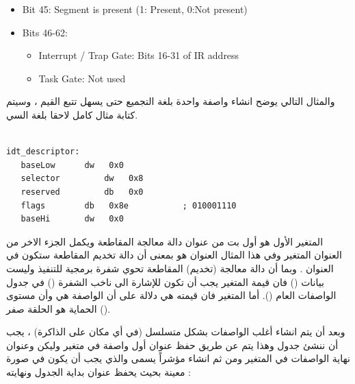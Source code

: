 \documentclass[document.tex]{subfiles}
\begin{document}
\begin{english}
\begin{itemize}
\item Bit 45: Segment is present (1: Present, 0:Not present)
\item Bits 46-62: 
\begin{itemize}
\item Interrupt / Trap Gate: Bits 16-31 of IR address
\item Task Gate: Not used
\end{itemize}

\end{itemize}
\end{english}

والمثال التالي يوضح انشاء واصفة واحدة بلغة التجميع حتى يسهل تتبع القيم ، وسيتم كتابة مثال كامل لاحقا بلغة السي.

\begin{english}

\lstset{numberstyle=\tiny,numbers=left,stepnumber=1,numbersep=5pt,tabsize=2,extendedchars=true,breaklines=true,frame=b,showspaces=false, showtabs=false,xleftmargin=10pt,framexleftmargin=10pt,framexrightmargin=5pt,framexbottommargin=4pt,showstringspaces=false,language=[x86masm]Assembler}


\begin{lstlisting}[label=idt_desc,caption=\en{Example of interrupt descriptor}]

idt_descriptor:
   baseLow     	dw   0x0 
   selector      	dw   0x8
   reserved     	db   0x0 
   flags      	db   0x8e           ; 010001110
   baseHi      	dw   0x0

\end{lstlisting}
\end{english}

المتغير الأول  هو أول  بت من عنوان دالة معالجة المقاطعة  ويكمل الجزء الاخر من العنوان المتغير  وفي هذا المثال العنوان هو  بمعنى أن دالة تخديم المقاطعة ستكون في العنوان .  وبما أن دالة معالجة (تخديم) المقاطعة تحوي شفرة برمجية للتنفيذ وليست بيانات () فان قيمة المتغير  يجب أن تكون  للإشارة الى ناخب الشفرة () في جدول الواصفات العام ().  أما المتغير  فان قيمته هي  دلالة على أن الواصفة هي  وأن مستوى الحماية هو الحلقة صفر ().


وبعد أن يتم انشاء أغلب الواصفات بشكل متسلسل (في أي مكان على الذاكرة) ، يجب أن ننشئ جدول  وهذا يتم عن طريق حفظ عنوان أول واصفة في متغير وليكن  وعنوان نهاية الواصفات في المتغير  ومن ثم انشاء مؤشراً يسمى  والذي يجب أن يكون في صورة معينة بحيث يحفظ عنوان بداية الجدول ونهايته :
\end{document}
